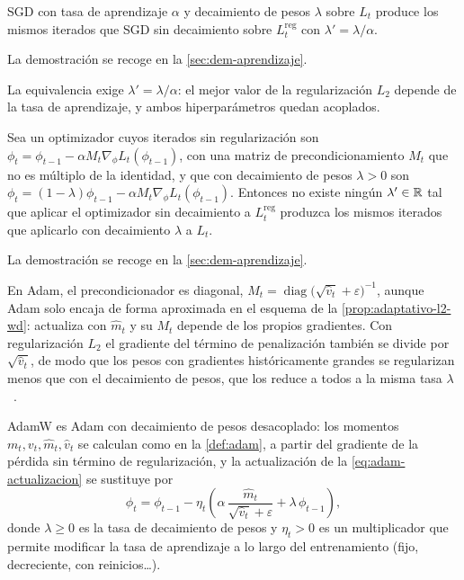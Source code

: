 \begin{proposicion}\label{prop:sgd-l2-wd}
SGD con tasa de aprendizaje $\alpha$ y decaimiento de pesos $\lambda$ sobre $L_t$
produce los mismos iterados que SGD sin decaimiento sobre $L_t^{\mathrm{reg}}$ con
$\lambda' = \lambda / \alpha$.
\end{proposicion}
La demostración se recoge en la \cref{sec:dem-aprendizaje}.

La equivalencia exige $\lambda' = \lambda / \alpha$: el mejor valor de la
regularización $L_2$ depende de la tasa de aprendizaje, y ambos hiperparámetros
quedan acoplados.

\begin{proposicion}\label{prop:adaptativo-l2-wd}
Sea un optimizador cuyos iterados sin regularización son
$\phi_t = \phi_{t-1} - \alpha M_t \nabla_\phi L_t(\phi_{t-1})$, con una matriz de
precondicionamiento $M_t$ que no es múltiplo de la identidad, y que con
decaimiento de pesos $\lambda > 0$ son
$\phi_t = (1-\lambda)\phi_{t-1} - \alpha M_t \nabla_\phi L_t(\phi_{t-1})$.
Entonces no existe ningún $\lambda' \in \mathbb{R}$ tal que aplicar el optimizador sin
decaimiento a $L_t^{\mathrm{reg}}$ produzca los mismos iterados que aplicarlo con
decaimiento $\lambda$ a $L_t$.
\end{proposicion}
La demostración se recoge en la \cref{sec:dem-aprendizaje}.

En Adam, el precondicionador es diagonal,
$M_t = \operatorname{diag}\bigl(\sqrt{\widehat{v}_t} + \varepsilon\bigr)^{-1}$,
aunque Adam solo encaja de forma aproximada en el esquema de la
\cref{prop:adaptativo-l2-wd}: actualiza con $\widehat{m}_t$ y su $M_t$ depende de
los propios gradientes. Con regularización $L_2$ el gradiente del término de
penalización también se divide por $\sqrt{\widehat{v}_t}$, de modo que los pesos
con gradientes históricamente grandes se regularizan menos que con el decaimiento
de pesos, que los reduce a todos a la misma tasa $\lambda$~\cite{loshchilov2019}.

\begin{definicion}\label{def:adamw}
AdamW es Adam con decaimiento de pesos desacoplado: los momentos
$m_t, v_t, \widehat{m}_t, \widehat{v}_t$ se calculan como en la
\cref{def:adam}, a partir del gradiente de la pérdida sin término de
regularización, y la actualización de la \cref{eq:adam-actualizacion} se
sustituye por
\begin{equation}\label{eq:adamw}
  \phi_t = \phi_{t-1} - \eta_t \left( \alpha\, \frac{\widehat{m}_t}{\sqrt{\widehat{v}_t} + \varepsilon}
             + \lambda\, \phi_{t-1} \right),
\end{equation}
donde $\lambda \ge 0$ es la tasa de decaimiento de pesos y $\eta_t > 0$ es un
multiplicador que permite modificar la tasa de aprendizaje a lo largo del
entrenamiento (fijo, decreciente, con reinicios…).
\end{definicion}

